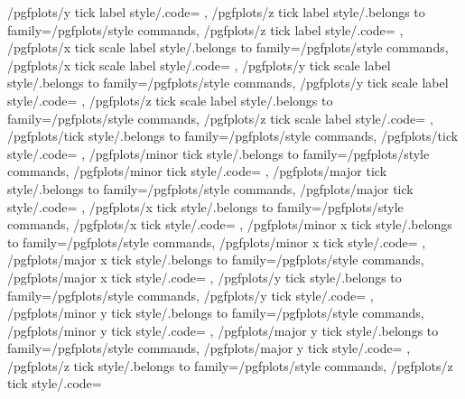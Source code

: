 {	/pgfplots/y tick label style/.code={%
	},
	/pgfplots/z tick label style/.belongs to family=/pgfplots/style commands,
	/pgfplots/z tick label style/.code={%
	},
	/pgfplots/x tick scale label style/.belongs to family=/pgfplots/style commands,
	/pgfplots/x tick scale label style/.code={%
	},
	/pgfplots/y tick scale label style/.belongs to family=/pgfplots/style commands,
	/pgfplots/y tick scale label style/.code={%
	},
	/pgfplots/z tick scale label style/.belongs to family=/pgfplots/style commands,
	/pgfplots/z tick scale label style/.code={%
	},
	/pgfplots/tick style/.belongs to family=/pgfplots/style commands,
	/pgfplots/tick style/.code={%
	},
	/pgfplots/minor tick style/.belongs to family=/pgfplots/style commands,
	/pgfplots/minor tick style/.code={%
	},
	/pgfplots/major tick style/.belongs to family=/pgfplots/style commands,
	/pgfplots/major tick style/.code={%
	},
	/pgfplots/x tick style/.belongs to family=/pgfplots/style commands,
	/pgfplots/x tick style/.code={%
	},
	/pgfplots/minor x tick style/.belongs to family=/pgfplots/style commands,
	/pgfplots/minor x tick style/.code={%
	},
	/pgfplots/major x tick style/.belongs to family=/pgfplots/style commands,
	/pgfplots/major x tick style/.code={%
	},
	/pgfplots/y tick style/.belongs to family=/pgfplots/style commands,
	/pgfplots/y tick style/.code={%
	},
	/pgfplots/minor y tick style/.belongs to family=/pgfplots/style commands,
	/pgfplots/minor y tick style/.code={%
	},
	/pgfplots/major y tick style/.belongs to family=/pgfplots/style commands,
	/pgfplots/major y tick style/.code={%
	},
	/pgfplots/z tick style/.belongs to family=/pgfplots/style commands,
	/pgfplots/z tick style/.code={%
}}
